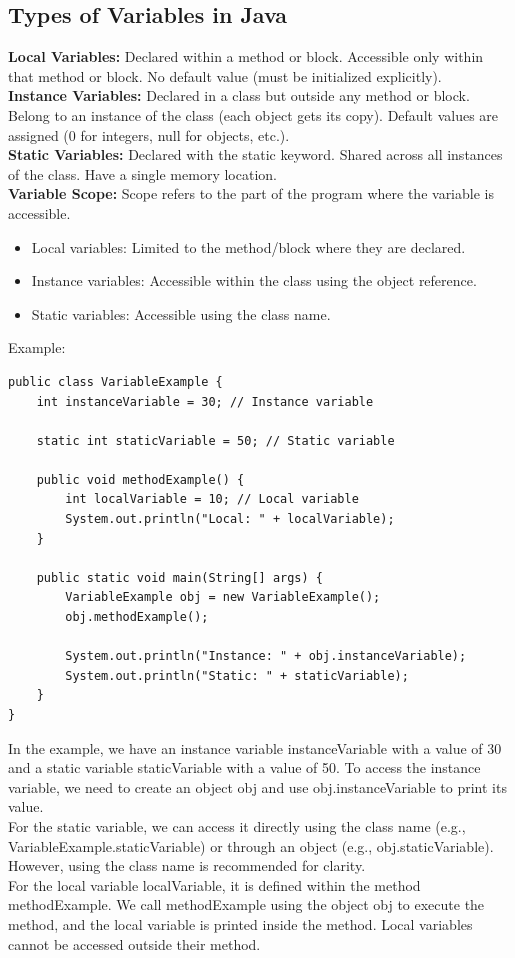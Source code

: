 \documentclass[letterpaper,12pt]{article}
\begin{document}
\subsection{Types of Variables in Java}
\textbf{Local Variables: }Declared within a method or block. Accessible only within that method or block. No default value (must be initialized explicitly).\\
\textbf{Instance Variables: }Declared in a class but outside any method or block. Belong to an instance of the class (each object gets its copy). Default values are assigned (0 for integers, null for objects, etc.).\\
\textbf{Static Variables:} Declared with the static keyword. Shared across all instances of the class. Have a single memory location.\\
\textbf{Variable Scope: }Scope refers to the part of the program where the variable is accessible.
\begin{itemize}
    \item Local variables: Limited to the method/block where they are declared.
    \item Instance variables: Accessible within the class using the object reference.
    \item Static variables: Accessible using the class name.
\end{itemize}
Example:
\begin{verbatim}
public class VariableExample {
    int instanceVariable = 30; // Instance variable

    static int staticVariable = 50; // Static variable

    public void methodExample() {
        int localVariable = 10; // Local variable
        System.out.println("Local: " + localVariable);
    }

    public static void main(String[] args) {
        VariableExample obj = new VariableExample();
        obj.methodExample();

        System.out.println("Instance: " + obj.instanceVariable);
        System.out.println("Static: " + staticVariable);
    }
}
\end{verbatim}
In the example, we have an instance variable instanceVariable with a value of 30 and a static variable staticVariable with a value of 50. To access the instance variable, we need to create an object obj and use obj.instanceVariable to print its value.\\
For the static variable, we can access it directly using the class name (e.g., VariableExample.staticVariable) or through an object (e.g., obj.staticVariable). However, using the class name is recommended for clarity.\\
For the local variable localVariable, it is defined within the method methodExample. We call methodExample using the object obj to execute the method, and the local variable is printed inside the method. Local variables cannot be accessed outside their method.
\end{document}

